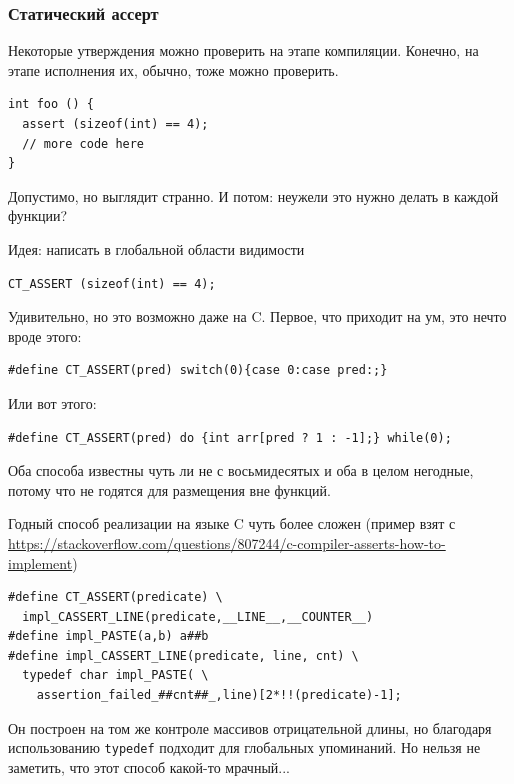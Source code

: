 \documentclass[a4paper,12pt,oneside]{article}
\begin{document}
\subsubsection{Статический ассерт}

Некоторые утверждения можно проверить на этапе компиляции. Конечно, на этапе исполнения их, обычно, тоже можно проверить.

\begin{lstlisting}
int foo () {
  assert (sizeof(int) == 4);
  // more code here
}
\end{lstlisting}

Допустимо, но выглядит странно. И потом: неужели это нужно делать в каждой функции?

Идея: написать в глобальной области видимости

\begin{lstlisting}
CT_ASSERT (sizeof(int) == 4);
\end{lstlisting}

Удивительно, но это возможно даже на C. Первое, что приходит на ум, это нечто вроде этого:

\begin{lstlisting}
#define CT_ASSERT(pred) switch(0){case 0:case pred:;}
\end{lstlisting}

Или вот этого:

\begin{lstlisting}
#define CT_ASSERT(pred) do {int arr[pred ? 1 : -1];} while(0);
\end{lstlisting}

Оба способа известны чуть ли не с восьмидесятых и оба в целом негодные, потому что не годятся для размещения вне функций.

Годный способ реализации на языке C чуть более сложен (пример взят с  \url{https://stackoverflow.com/questions/807244/c-compiler-asserts-how-to-implement})

\begin{lstlisting}
#define CT_ASSERT(predicate) \
  impl_CASSERT_LINE(predicate,__LINE__,__COUNTER__)
#define impl_PASTE(a,b) a##b
#define impl_CASSERT_LINE(predicate, line, cnt) \
  typedef char impl_PASTE( \
    assertion_failed_##cnt##_,line)[2*!!(predicate)-1];
\end{lstlisting}

Он построен на том же контроле массивов отрицательной длины, но благодаря использованию \lstinline!typedef! подходит для глобальных упоминаний. Но нельзя не заметить, что этот способ какой-то мрачный...
\end{document}
